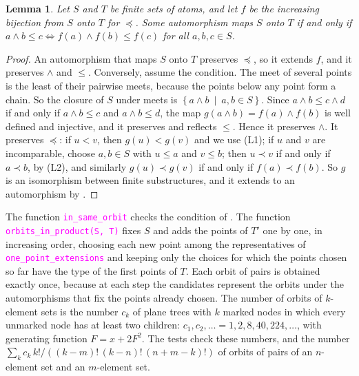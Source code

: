 \documentclass[12pt,a4paper,article]{memoir}
\newcommand{\setof}[2]{\left\{#1\ \mid\ #2 \right\}}
\newcommand{\code}[1]{\texttt{\textcolor{magenta}{#1}}}
\newtheorem{lemma}[theorem]{Lemma}
\theoremstyle{definition}
\begin{document}
\begin{lemma}\label{lem:tree orbits}
Let $S$ and $T$ be finite sets of atoms,
and let $f$ be the increasing bijection from $S$ onto $T$ for $\preceq$.
Some automorphism maps $S$ onto $T$ if and only if
$a \wedge b \le c \iff f(a) \wedge f(b) \le f(c)$ for all $a, b, c \in S$.
\end{lemma}
\begin{proof}
An automorphism that maps $S$ onto $T$ preserves $\preceq$, so it extends $f$,
and it preserves $\wedge$ and $\le$.
Conversely, assume the condition.
The meet of several points is the least of their pairwise meets,
because the points below any point form a chain.
So the closure of $S$ under meets is $\setof{a \wedge b}{a, b \in S}$.
Since $a \wedge b \le c \wedge d$ if and only if $a \wedge b \le c$ and $a \wedge b \le d$,
the map $g(a \wedge b) = f(a) \wedge f(b)$ is well defined and injective, and it preserves and reflects $\le$.
Hence it preserves $\wedge$.
It preserves $\preceq$: if $u < v$, then $g(u) < g(v)$ and we use (L1);
if $u$ and $v$ are incomparable, choose $a, b \in S$ with $u \le a$ and $v \le b$;
then $u \prec v$ if and only if $a \prec b$, by (L2),
and similarly $g(u) \prec g(v)$ if and only if $f(a) \prec f(b)$.
So $g$ is an isomorphism between finite substructures,
and it extends to an automorphism by .
\end{proof}

The function \code{in\_same\_orbit} checks the condition of .
The function \code{orbits\_in\_product(S, T)} fixes $S$ and adds the points of $T'$ one by one, in increasing order,
choosing each new point among the representatives of \code{one\_point\_extensions}
and keeping only the choices for which the points chosen so far have the type of the first points of $T$.
Each orbit of pairs is obtained exactly once,
because at each step the candidates represent the orbits under the automorphisms that fix the points already chosen.
The number of orbits of $k$-element sets is the number $c_k$ of plane trees with $k$ marked nodes
in which every unmarked node has at least two children:
$c_1, c_2, \dots = 1, 2, 8, 40, 224, \dots$, with generating function $F = x + 2F^2$.
The tests check these numbers,
and the number $\sum_k c_k \, k! / ((k-m)!\,(k-n)!\,(n+m-k)!)$ of orbits of pairs of an $n$-element set and an $m$-element set.
\end{document}
